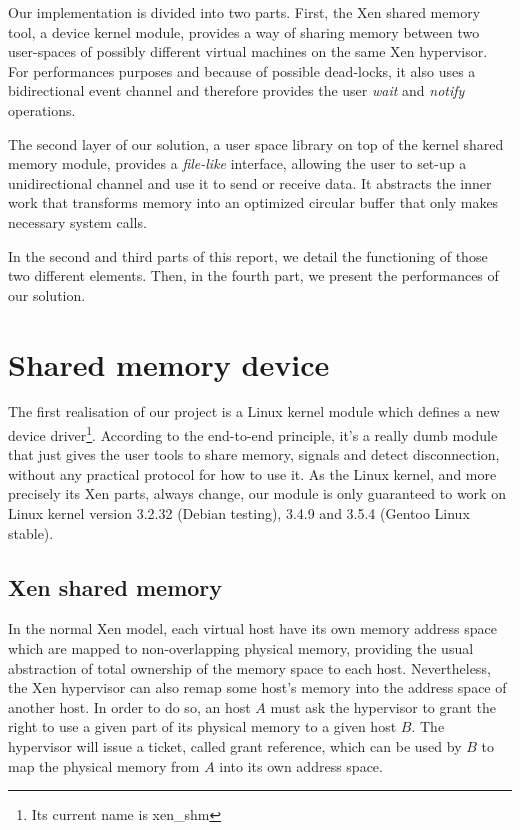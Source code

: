 \documentclass[journal]{IEEEtran}
\begin{document}


Our implementation is divided into two parts. First, the Xen shared memory tool, a device kernel module, provides a way of sharing memory between two user-spaces of possibly different virtual machines on the same Xen hypervisor. For performances purposes and because of possible dead-locks, it also uses a bidirectional event channel and therefore provides the user \emph{wait} and \emph{notify} operations.

The second layer of our solution, a user space library on top of the kernel shared memory module, provides a \emph{file-like} interface, allowing the user to set-up a unidirectional channel and use it to send or receive data. It abstracts the inner work that transforms memory into an optimized circular buffer that only makes necessary system calls.

In the second and third parts of this report, we detail the functioning of those two different elements. Then, in the fourth part, we present the performances of our solution. 

\section{Shared memory device}

The first realisation of our project is a Linux kernel module which defines a new device driver\footnote{Its current name is xen\_shm}.
According to the end-to-end principle, it's a really dumb module that just gives the user tools to share memory, signals and detect disconnection, without any practical protocol for how to use it.
As the Linux kernel, and more precisely its Xen parts, always change, our module is only guaranteed to work on Linux kernel version 3.2.32 (Debian testing), 3.4.9 and 3.5.4 (Gentoo Linux stable).

\subsection{Xen shared memory}
\label{xen_shared_memory}

In the normal Xen model, each virtual host have its own memory address space which are mapped to non-overlapping physical memory, providing the usual abstraction of total ownership of the memory space to each host. Nevertheless, the Xen hypervisor can also remap some host's memory into the address space of another host. In order to do so, an host $A$ must ask the hypervisor to grant the right to use a given part of its physical memory to a given host $B$. The hypervisor will issue a ticket, called grant reference, which can be used by $B$ to map the physical memory from $A$ into its own address space.
\end{document}
